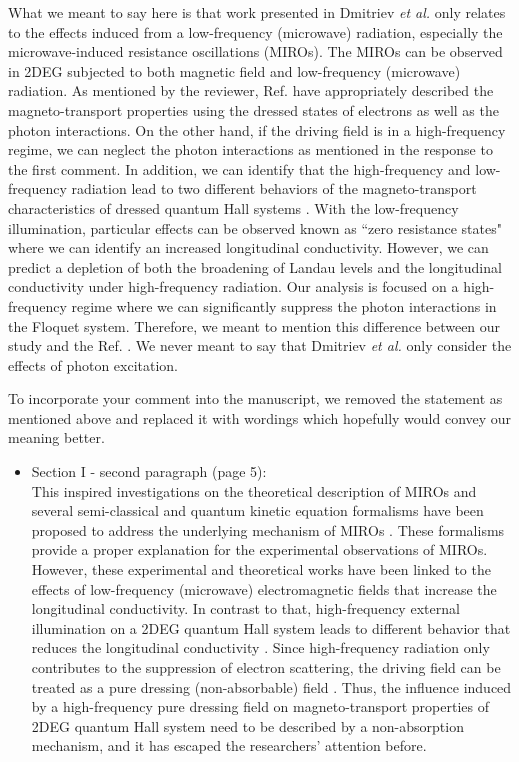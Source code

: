 \documentclass{article}
\begin{document}
What we meant to say here is that work presented in Dmitriev \textit{et al.} \cite{dmitriev09} only relates to the effects induced from a low-frequency (microwave) radiation, especially the microwave-induced resistance oscillations (MIROs). The MIROs can be observed in 2DEG subjected to both magnetic field and low-frequency (microwave) radiation. As mentioned by the reviewer, Ref. \cite{dmitriev09} have appropriately described the magneto-transport properties using the dressed states of electrons as well as the photon interactions. On the other hand, if the driving field is in a high-frequency regime, we can neglect the photon interactions as mentioned in the response to the first comment. In addition, we can identify that the high-frequency and low-frequency radiation lead to two different behaviors of the magneto-transport characteristics of dressed quantum Hall systems \cite{dini16}. With the low-frequency illumination, particular effects can be observed known as ``zero resistance states" where we can identify an increased longitudinal conductivity. However, we can predict a depletion of both the broadening of Landau levels and the longitudinal conductivity under high-frequency radiation.
Our analysis is focused on a high-frequency regime where we can significantly suppress the photon interactions in the Floquet system. Therefore, we meant to mention this difference between our study and the Ref. \cite{dmitriev09}. We never meant to say that Dmitriev \textit{et al.} \cite{dmitriev09} only consider the effects of photon excitation.

To incorporate your comment into the manuscript, we removed the statement as mentioned above and replaced it with wordings which hopefully would convey our meaning better.

\begin{itemize}
  \item Section I - second paragraph (page 5):\\
  {\color{Red}
  This inspired investigations on the theoretical description of MIROs and several semi-classical and quantum kinetic equation formalisms have been proposed to address the underlying mechanism of MIROs \cite{durst03,dmitriev03,dmitriev05,dmitriev09}. These formalisms provide a proper explanation for the experimental observations of MIROs. However, these experimental and theoretical works have been linked to the effects of low-frequency (microwave) electromagnetic fields that increase the longitudinal conductivity.
  In contrast to that, high-frequency external illumination on a 2DEG quantum Hall system leads to different behavior that reduces the longitudinal conductivity \cite{dini16}.
  Since high-frequency radiation only contributes to the suppression of electron scattering, the driving field can be treated as a pure dressing (non-absorbable) field \cite{dini16}.
  Thus, the influence induced by a high-frequency pure dressing field on
  magneto-transport properties of 2DEG quantum Hall system need to be described by a non-absorption mechanism, and it has escaped the researchers’ attention before.
  }
\end{itemize}
\end{document}
